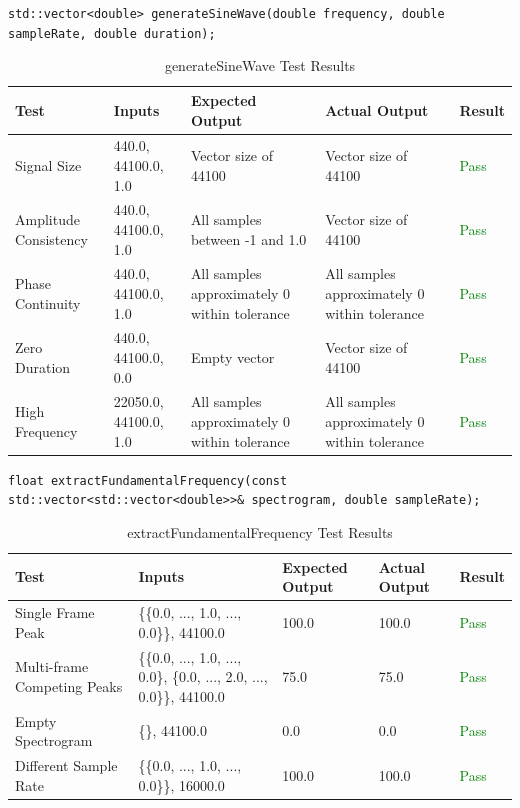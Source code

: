\documentclass[12pt, titlepage]{article}
\begin{document}
\texttt{std::vector<double> generateSineWave(double frequency, double sampleRate, double duration);}
\begin{longtable}{|L{3cm}|L{2cm}|L{2cm}|L{2cm}|l|}
  \caption{generateSineWave Test Results} \\
  \hline
  \textbf{Test} & \textbf{Inputs} & \textbf{Expected Output} & \textbf{Actual Output} & \textbf{Result} \\
  \hline
  Signal Size & 440.0, 44100.0, 1.0 & Vector size of 44100 & Vector size of 44100 & \textcolor{green}{Pass} \\
  \hline
  Amplitude Consistency & 440.0, 44100.0, 1.0 & All samples between -1 and 1.0 & Vector size of 44100 & \textcolor{green}{Pass} \\
  \hline
  Phase Continuity & 440.0, 44100.0, 1.0 & All samples approximately 0 within tolerance & All samples approximately 0 within tolerance & \textcolor{green}{Pass} \\
  \hline
  Zero Duration & 440.0, 44100.0, 0.0 & Empty vector & Vector size of 44100 & \textcolor{green}{Pass} \\
  \hline
  High Frequency & 22050.0, 44100.0, 1.0 & All samples approximately 0 within tolerance & All samples approximately 0 within tolerance & \textcolor{green}{Pass} \\
  \hline
\end{longtable}


\noindent\texttt{float extractFundamentalFrequency(const std::vector<std::vector<double>>\& spectrogram, double sampleRate);}

\begin{longtable}{|L{3cm}|L{2cm}|L{2cm}|L{2cm}|l|}
  \caption{extractFundamentalFrequency Test Results} \\
  \hline
  \textbf{Test} & \textbf{Inputs} & \textbf{Expected Output} & \textbf{Actual Output} & \textbf{Result} \\
  \hline
  Single Frame Peak & \{\{0.0, ..., 1.0, ..., 0.0\}\}, 44100.0 & 100.0 & 100.0 & \textcolor{green}{Pass} \\
  \hline
  Multi-frame Competing Peaks & \{\{0.0, ..., 1.0, ..., 0.0\}, \{0.0, ..., 2.0, ..., 0.0\}\}, 44100.0 & 75.0 & 75.0 & \textcolor{green}{Pass} \\
  \hline
  Empty Spectrogram & \{\}, 44100.0 & 0.0 & 0.0 & \textcolor{green}{Pass} \\
  \hline
  Different Sample Rate & \{\{0.0, ..., 1.0, ..., 0.0\}\}, 16000.0 & 100.0 & 100.0 & \textcolor{green}{Pass} \\
  \hline
\end{longtable}
\end{document}
